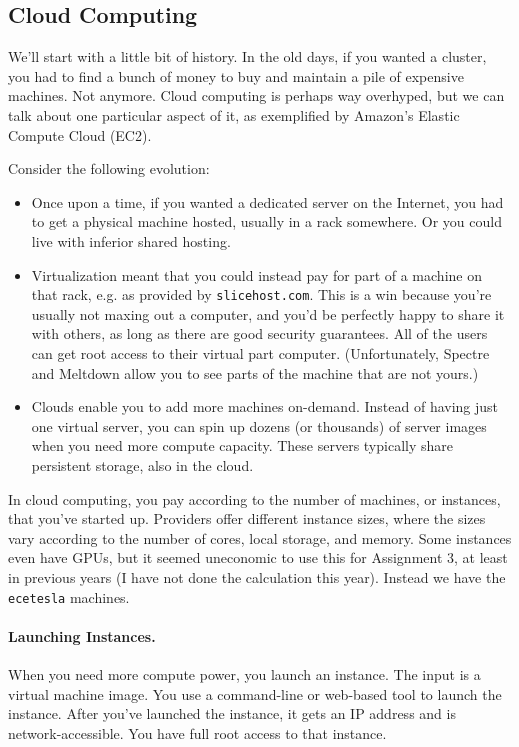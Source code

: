 \documentclass[a4paper]{report}
\begin{document}
\subsection*{Cloud Computing}
We'll start with a little bit of history.
In the old days, if you wanted a cluster, you had to find a bunch of
money to buy and maintain a pile of expensive machines. Not anymore.
Cloud computing is perhaps way overhyped, but we can talk about 
one particular aspect of it, as exemplified by Amazon's Elastic
Compute Cloud (EC2).

Consider the following evolution:
\begin{itemize}
\item Once upon a time, if you wanted a dedicated server on the
  Internet, you had to get a physical machine hosted, usually in a
  rack somewhere. Or you could live with inferior shared hosting.
\item Virtualization meant that you could instead pay for part of a
  machine on that rack, e.g. as provided by {\tt slicehost.com}.  This
  is a win because you're usually not maxing out a computer, and you'd
  be perfectly happy to share it with others, as long as there are
  good security guarantees. All of the users can get root access to their virtual part computer.
  (Unfortunately, Spectre and Meltdown allow you to see parts of the machine that are not yours.)
\item Clouds enable you to add more machines on-demand. Instead of
  having just one virtual server, you can spin up dozens (or
  thousands) of server images when you need more compute
  capacity. These servers typically share persistent storage, also in
  the cloud. 
\end{itemize}

In cloud computing, you pay according to the number of machines, or
instances, that you've started up. Providers offer different instance
sizes, where the sizes vary according to the number of cores, local
storage, and memory. Some instances even have GPUs, but it seemed 
uneconomic to use this for Assignment 3, at least in previous years (I
have not done the calculation this year). 
Instead we have the {\tt ecetesla} machines.

\paragraph{Launching Instances.} When you need more compute power,
you launch an instance. The input is a virtual machine image.  You use
a command-line or web-based tool to launch the instance.  After you've
launched the instance, it gets an IP address and is
network-accessible. You have full root access to that instance.
\end{document}
